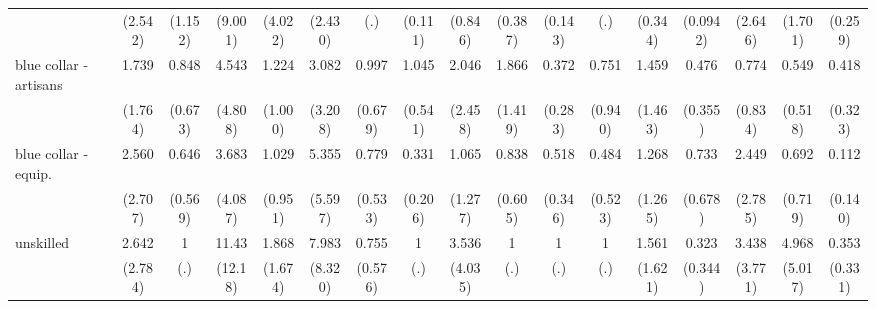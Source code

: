 {\begin{tabular}{l*{16}{c}}
                    &     (2.542)         &     (1.152)         &     (9.001)         &     (4.022)         &     (2.430)         &         (.)         &     (0.111)         &     (0.846)         &     (0.387)         &     (0.143)         &         (.)         &     (0.344)         &    (0.0942)         &     (2.646)         &     (1.701)         &     (0.259)         \\
[1em]
blue collar - artisans&       1.739         &       0.848         &       4.543         &       1.224         &       3.082         &       0.997         &       1.045         &       2.046         &       1.866         &       0.372         &       0.751         &       1.459         &       0.476         &       0.774         &       0.549         &       0.418         \\
                    &     (1.764)         &     (0.673)         &     (4.808)         &     (1.000)         &     (3.208)         &     (0.679)         &     (0.541)         &     (2.458)         &     (1.419)         &     (0.283)         &     (0.940)         &     (1.463)         &     (0.355)         &     (0.834)         &     (0.518)         &     (0.323)         \\
[1em]
blue collar - equip.&       2.560         &       0.646         &       3.683         &       1.029         &       5.355         &       0.779         &       0.331         &       1.065         &       0.838         &       0.518         &       0.484         &       1.268         &       0.733         &       2.449         &       0.692         &       0.112         \\
                    &     (2.707)         &     (0.569)         &     (4.087)         &     (0.951)         &     (5.597)         &     (0.533)         &     (0.206)         &     (1.277)         &     (0.605)         &     (0.346)         &     (0.523)         &     (1.265)         &     (0.678)         &     (2.785)         &     (0.719)         &     (0.140)         \\
[1em]
unskilled           &       2.642         &           1         &       11.43\sym{*}  &       1.868         &       7.983\sym{*}  &       0.755         &           1         &       3.536         &           1         &           1         &           1         &       1.561         &       0.323         &       3.438         &       4.968         &       0.353         \\
                    &     (2.784)         &         (.)         &     (12.18)         &     (1.674)         &     (8.320)         &     (0.576)         &         (.)         &     (4.035)         &         (.)         &         (.)         &         (.)         &     (1.621)         &     (0.344)         &     (3.771)         &     (5.017)         &     (0.331)         \\

\end{tabular}}
